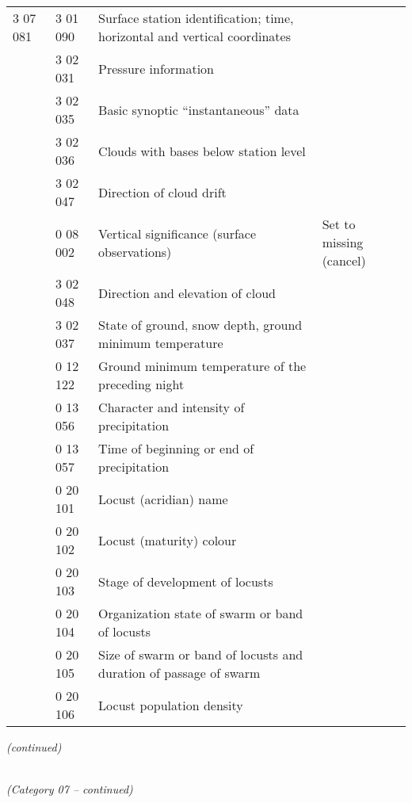 \begin{longtable}[]{@{}llll@{}}
3 07 081 & 3 01 090 & Surface station identification; time, horizontal and vertical coordinates &\tabularnewline
& 3 02 031 & Pressure information &\tabularnewline
& 3 02 035 & Basic synoptic ``instantaneous'' data &\tabularnewline
& 3 02 036 & Clouds with bases below station level &\tabularnewline
& 3 02 047 & Direction of cloud drift &\tabularnewline
& 0 08 002 & Vertical significance (surface observations) & Set to missing (cancel)\tabularnewline
& 3 02 048 & Direction and elevation of cloud &\tabularnewline
& 3 02 037 & State of ground, snow depth, ground minimum temperature &\tabularnewline
& 0 12 122 & Ground minimum temperature of the preceding night &\tabularnewline
& 0 13 056 & Character and intensity of precipitation &\tabularnewline
& 0 13 057 & Time of beginning or end of precipitation &\tabularnewline
& 0 20 101 & Locust (acridian) name &\tabularnewline
& 0 20 102 & Locust (maturity) colour &\tabularnewline
& 0 20 103 & Stage of development of locusts &\tabularnewline
& 0 20 104 & Organization state of swarm or band of locusts &\tabularnewline
& 0 20 105 & Size of swarm or band of locusts and duration of passage of swarm &\tabularnewline
& 0 20 106 & Locust population density &\tabularnewline
\bottomrule
\end{longtable}

\emph{(continued)}

\emph{\\
(Category 07 -- continued)}

